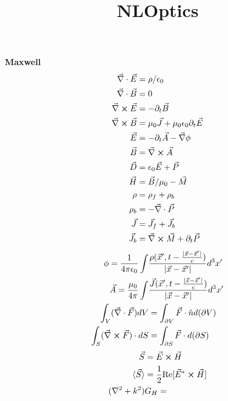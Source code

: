\documentclass[12pt]{article}
\title{\vspace{-2em}NLOptics}
\date{}
\begin{document}
\maketitle

\vspace{-4em}
\begin{multicols}{3}

\textbf{Maxwell}
\begin{align}
  \vec{\nabla} \cdot \vec{E} &= \rho / \epsilon_0\\
  \vec{\nabla} \cdot \vec{B} &= 0\\
  \vec{\nabla} \cross \vec{E} &= - \partial_t \vec{B}\\
  \vec{\nabla} \cross \vec{B} &= \mu_0 \vec{J} +
  \mu_0 \epsilon_0 \partial_t \vec{E}\\
  \vec{E} &= -\partial_t \vec{A} - \vec{\nabla} \phi\\
  \vec{B} &= \vec{\nabla} \cross \vec{A}\\
  \vec{D} &= \epsilon_0 \vec{E} + \vec{P}\\
  \vec{H} &= \vec{B}/\mu_0 - \vec{M}\\
  \rho &= \rho_f + \rho_b\\
  \rho_b &= -\vec{\nabla} \cdot \vec{P}\\
  \vec{J} &= \vec{J}_{f} + \vec{J}_{b}\\
  \vec{J}_b &= \vec{\nabla} \cross \vec{M} + \partial_t \vec{P}
\end{align}
\begin{align}
  \phi = \frac{1}{4\pi\epsilon_0} \int &\frac{
    \rho(\vec{x}^{\prime}, t - \frac{\lvert\vec{x} - \vec{x}^{\prime}\rvert}{c})}{
    \lvert \vec{x} - \vec{x}^{\prime} \rvert} d^3 x^{\prime}\\
  \vec{A} = \frac{\mu_0}{4\pi} \int &\frac{\vec{J}(\vec{x}^{\prime},
    t - \frac{\lvert \vec{x} - \vec{x}^{\prime} \rvert}{c})}
  {\lvert \vec{x} - \vec{x}^{\prime} \rvert} d^3 x^{\prime}\\
  \int_V (\vec{\nabla} \cdot \vec{F}) dV &= \int_{\partial V} \vec{F} \cdot \hat{n} d(\partial V)\\
  \int_{S} (\vec{\nabla} \cross \vec{F}) \cdot dS &= \int_{\partial S} \vec{F} \cdot d(\partial S)
\end{align}
\begin{align}
  \vec{S} &= \vec{E} \cross \vec{H}\\
  \langle \vec{S} \rangle &= \frac{1}{2}
  \textrm{Re}[\vec{E}^{*} \cross \vec{H}]\\
  (\nabla^2 + k^2) &G_{H} =

\end{align}
\end{multicols}
\end{document}
